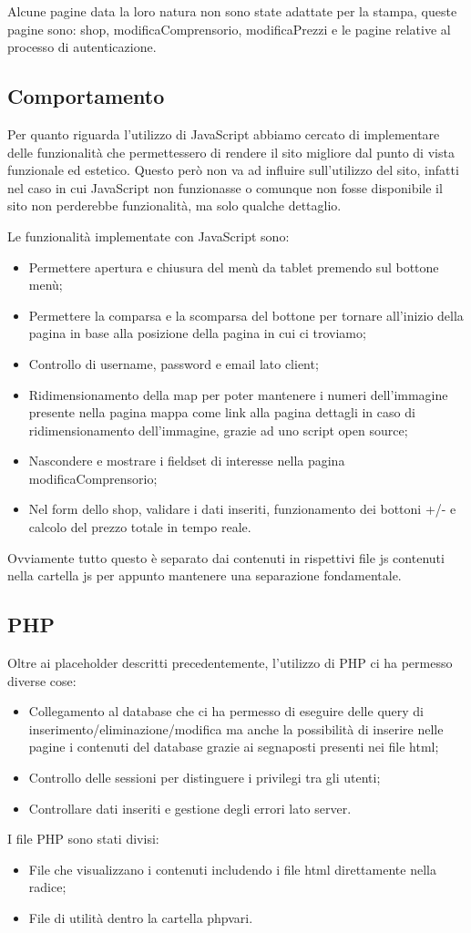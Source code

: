 Alcune pagine data la loro natura non sono state adattate per la stampa, queste pagine sono: shop, modificaComprensorio, modificaPrezzi e le pagine relative al processo di autenticazione.

\subsection{Comportamento}

Per quanto riguarda l'utilizzo di JavaScript abbiamo cercato di implementare delle funzionalità che permettessero di rendere il sito migliore dal punto di vista funzionale ed estetico.
Questo però non va ad influire sull'utilizzo del sito, infatti nel caso in cui JavaScript non funzionasse o comunque non fosse disponibile il sito non perderebbe funzionalità, ma solo qualche dettaglio.

Le funzionalità implementate con JavaScript sono:
\begin{itemize}
    \item Permettere apertura e chiusura del menù da tablet premendo sul bottone menù;
    \item Permettere la comparsa e la scomparsa del bottone per tornare all'inizio della pagina in base alla posizione della pagina in cui ci troviamo;
    \item Controllo di username, password e email lato client;
    \item Ridimensionamento della map per poter mantenere i numeri dell'immagine presente nella pagina mappa come link alla pagina dettagli in caso di ridimensionamento dell'immagine, grazie ad uno script open source;
    \item Nascondere e mostrare i fieldset di interesse nella pagina modificaComprensorio;
    \item Nel form dello shop, validare i dati inseriti, funzionamento dei bottoni +/- e calcolo del prezzo totale in tempo reale.
\end{itemize}

Ovviamente tutto questo è separato dai contenuti in rispettivi file js contenuti nella cartella js per appunto mantenere una separazione fondamentale.

\subsection{PHP}

Oltre ai placeholder descritti precedentemente, l'utilizzo di PHP ci ha permesso diverse cose:
\begin{itemize}
    \item Collegamento al database che ci ha permesso di eseguire delle query di inserimento/eliminazione/modifica ma anche la possibilità
        di inserire nelle pagine i contenuti del database grazie ai segnaposti presenti nei file html;
    \item Controllo delle sessioni per distinguere i privilegi tra gli utenti;
    \item Controllare dati inseriti e gestione degli errori lato server.
\end{itemize}

I file PHP sono stati divisi:
\begin{itemize}
    \item File che visualizzano i contenuti includendo i file html direttamente nella radice;
    \item File di utilità dentro la cartella php\textunderscore vari.
\end{itemize}